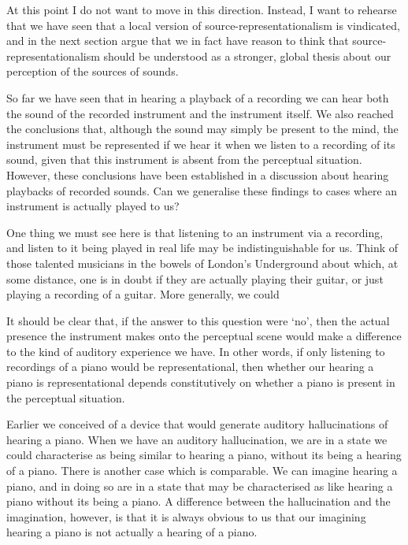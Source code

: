 \documentclass[sloppy, journal, git, bytitle, dodraft]{humapap}
\begin{document}
At this point I do not want to move in this direction. Instead, I want to rehearse that we have seen that a local version of source-representationalism is vindicated, and in the next section argue that we in fact have reason to think that source-representationalism should be understood as a stronger, global thesis about our perception of the sources of sounds. 


\sect So far we have seen that in hearing a playback of a recording we can hear both the sound of the recorded instrument and the instrument itself. We also reached the conclusions that, although the sound may simply be present to the mind, the instrument must be represented if we hear it when we listen to a recording of its sound, given that this instrument is absent from the perceptual situation. However, these conclusions have been established in a discussion about hearing playbacks of recorded sounds. Can we generalise these findings to cases where an instrument is actually played to us? 

One thing we must see here is that listening to an instrument via a recording, and listen to it being played in real life may be indistinguishable for us. Think of those talented musicians in the bowels of London's Underground about which, at some distance, one is in doubt if they are actually playing their guitar, or just playing a recording of a guitar. More generally, we could  


It should be clear that, if the answer to this question were `no', then the actual presence the instrument makes onto the perceptual scene would make a difference to the kind of auditory experience we have. In other words, if only listening to recordings of a piano would be representational, then whether our hearing a piano is representational depends constitutively on whether a piano is present in the perceptual situation.




Earlier we conceived of a device that would generate auditory hallucinations of hearing a piano. When we have an auditory hallucination, we are in a state we could characterise as being similar to hearing a piano, without its being a hearing of a piano. There is another case which is comparable. We can imagine hearing a piano, and in doing so are in a state that may be characterised as like hearing a piano without its being a piano. A difference between the hallucination and the imagination, however, is that it is always obvious to us that our imagining hearing a piano is not actually a hearing of a piano. 
\end{document}
